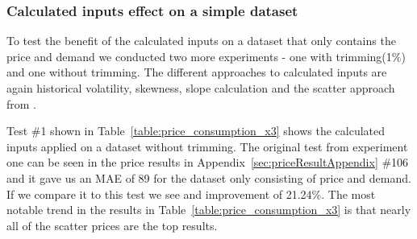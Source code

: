 \subsubsection{Calculated inputs effect on a simple dataset}
To test the benefit of the calculated inputs on a dataset that only contains the price and demand we conducted two more experiments - one with trimming(1\%) and one without trimming. The different approaches to calculated inputs are again historical volatility, skewness, slope calculation and the scatter approach from \cite{singhal2011electricity}. 

Test \#1 shown in Table~\ref{table:price_consumption_x3} shows the calculated inputs applied on a dataset without trimming. The original test from experiment one can be seen in the price results in Appendix~\ref{sec:priceResultAppendix} \#106 and it gave us an MAE of 89 for the dataset only consisting of price and demand. If we compare it to this test we see and improvement of 21.24\%. The most notable trend in the results in Table~\ref{table:price_consumption_x3} is that nearly all of the scatter prices are the top results. 

